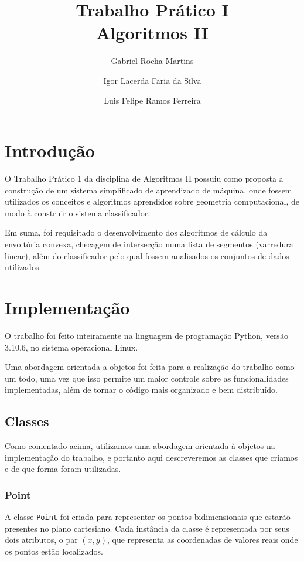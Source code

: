 \documentclass{article}
\author{
    Gabriel Rocha Martins
    \and 
    Igor Lacerda Faria da Silva
    \and 
    Luis Felipe Ramos Ferreira
}
\title{Trabalho Prático I \\
Algoritmos II}
\date{%
}
\begin{document}
\maketitle

\section{Introdução}

O Trabalho Prático 1 da disciplina de Algoritmos II possuiu como proposta a construção de um sistema simplificado de aprendizado de máquina, onde fossem utilizados os conceitos e algoritmos aprendidos sobre geometria computacional, de modo à construir o sistema classificador.

Em suma, foi requisitado o desenvolvimento dos algoritmos de cálculo da envoltória convexa, checagem de intersecção numa lista de segmentos (varredura linear), além do classificador pelo qual fossem analisados os conjuntos de dados utilizados.

\section{Implementação}
O trabalho foi feito inteiramente na linguagem de programação Python, versão 3.10.6, no sistema operacional Linux.

Uma abordagem orientada a objetos foi feita para a realização do trabalho como um todo, uma vez que isso permite um maior controle sobre as funcionalidades implementadas, além de tornar o código mais organizado e bem distribuído.

\subsection{Classes}
Como comentado acima, utilizamos uma abordagem orientada à objetos na implementação do trabalho, e portanto aqui descreveremos as classes que criamos e de que forma foram utilizadas.

\subsubsection{Point}

A classe \texttt{Point} foi criada para representar os pontos bidimensionais que estarão presentes no plano cartesiano. Cada instância da classe é representada por seus dois atributos, o par \( (x,y) \), que representa as coordenadas de valores reais onde os pontos estão localizados.
\end{document}
